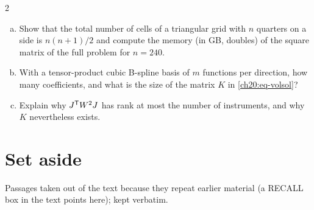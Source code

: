 \begin{paracol}{2}
\begin{exercise}
\leavevmode
\begin{enumerate}[(a)]
  \item Show that the total number of cells of a triangular grid with $n$ quarters on a side is $n(n+1)/2$ and compute the memory (in GB, doubles) of the square matrix of the full problem for $n=240$.
  \item With a tensor-product cubic B-spline basis of $m$ functions per direction, how many coefficients, and what is the size of the matrix $K$ in \eqref{ch20:eq-volsol}?
  \item Explain why $J^{\mathsf T} W^2J$ has rank at most the number of instruments, and why $K$ nevertheless exists.
\end{enumerate}
\end{exercise}

\section*{Set aside}\label{ch20:sec-setaside}
Passages taken out of the text because they repeat earlier material (a RECALL box in the text points here); kept verbatim.


\end{paracol}
